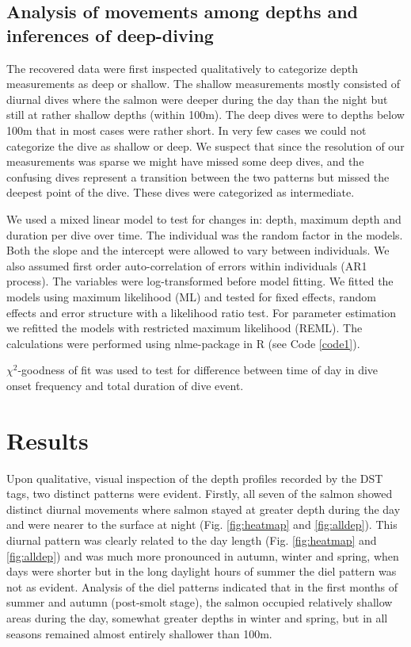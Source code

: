 \subsection{Analysis of movements among depths and inferences of deep-diving}
The recovered data were first inspected qualitatively to categorize depth measurements as deep or shallow.  The shallow measurements mostly consisted of diurnal dives where the salmon were deeper during the day than the night but still at rather shallow depths (within 100m). 
The deep dives were to depths below 100m that in most cases were rather short. In very few cases we could not categorize the dive as shallow or deep. 
We suspect that since the resolution of our measurements was sparse we might have missed some deep dives, and the confusing dives represent a transition between the two patterns but missed the deepest point of the dive. These dives were categorized as intermediate.

We used a mixed linear model to test for changes in: depth, maximum depth and duration per dive over time. 
The individual was the random factor in the models. Both the slope and the intercept were allowed to vary between individuals. We also assumed first order auto-correlation of errors within individuals (AR1 process). The variables were log-transformed before model fitting. We fitted the models using maximum likelihood (ML) and tested for fixed effects, random effects and error structure with a likelihood ratio test. For parameter estimation we refitted the models with restricted maximum likelihood (REML). The calculations were performed using nlme-package \citep{Pinheiro2009} in R (see Code \ref{code1}).

$\chi^2$-goodness of fit was used to test for difference between time of day in dive onset frequency and total duration of dive event. 

\section{Results}
\label{Res}
Upon qualitative, visual inspection of the depth profiles recorded by the DST tags, two distinct patterns were evident. 
Firstly, all seven of the salmon showed distinct diurnal movements where salmon stayed at greater depth during the day and were nearer to the surface at night (Fig. \ref{fig:heatmap} and \ref{fig:alldep}). 
This diurnal pattern was clearly related to the day length (Fig. \ref{fig:heatmap} and \ref{fig:alldep}) and was much more pronounced in autumn, winter and spring, when days were shorter but in the long daylight hours of summer the diel pattern was not as evident. Analysis of the diel patterns indicated that in the first months of summer and autumn (post-smolt stage), the salmon occupied relatively shallow areas during the day, somewhat greater depths in winter and spring, but in all seasons remained almost entirely shallower than 100m.

